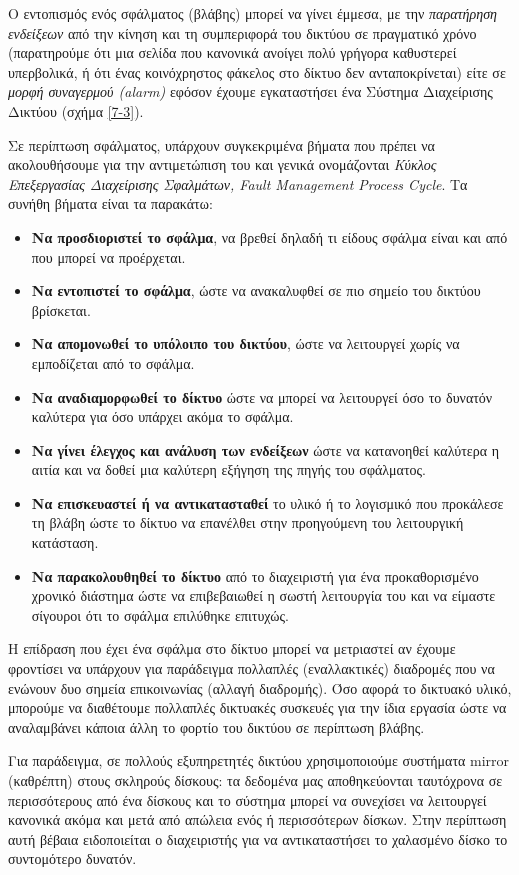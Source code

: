 Ο εντοπισμός ενός σφάλματος (βλάβης) μπορεί να γίνει έμμεσα, με την \emph{παρατήρηση ενδείξεων} από την κίνηση και τη συμπεριφορά του δικτύου σε πραγματικό χρόνο (παρατηρούμε ότι μια σελίδα που κανονικά ανοίγει πολύ γρήγορα καθυστερεί υπερβολικά, ή ότι ένας κοινόχρηστος φάκελος στο δίκτυο δεν ανταποκρίνεται) είτε σε \emph{μορφή συναγερμού (alarm)} εφόσον έχουμε εγκαταστήσει ένα Σύστημα Διαχείρισης Δικτύου (σχήμα \ref{7-3}). 

Σε περίπτωση σφάλματος, υπάρχουν συγκεκριμένα βήματα που πρέπει να ακολουθήσουμε για την αντιμετώπιση του και γενικά ονομάζονται \emph{Κύκλος Επεξεργασίας Διαχείρισης Σφαλμάτων, Fault Management Process Cycle}. Τα συνήθη βήματα είναι τα παρακάτω:

\begin{itemize}
\item \textbf{Να προσδιοριστεί το σφάλμα}, να βρεθεί δηλαδή τι είδους σφάλμα είναι και από που μπορεί να προέρχεται.
\item \textbf{Να εντοπιστεί το σφάλμα}, ώστε να ανακαλυφθεί σε πιο σημείο του δικτύου βρίσκεται.
\item \textbf{Να απομονωθεί το υπόλοιπο του δικτύου}, ώστε να λειτουργεί χωρίς να εμποδίζεται από το σφάλμα.
\item \textbf{Να αναδιαμορφωθεί το δίκτυο} ώστε να μπορεί να λειτουργεί όσο το δυνατόν καλύτερα για όσο υπάρχει ακόμα το σφάλμα.
\item \textbf{Να γίνει έλεγχος και ανάλυση των ενδείξεων} ώστε να κατανοηθεί καλύτερα η αιτία και να δοθεί μια καλύτερη εξήγηση της πηγής του σφάλματος.
\item \textbf{Να επισκευαστεί ή να αντικατασταθεί} το υλικό ή το λογισμικό που προκάλεσε τη βλάβη ώστε το δίκτυο να επανέλθει στην προηγούμενη του λειτουργική κατάσταση.
\item \textbf{Να παρακολουθηθεί το δίκτυο} από το διαχειριστή για ένα προκαθορισμένο χρονικό διάστημα ώστε να επιβεβαιωθεί η σωστή λειτουργία του και να είμαστε σίγουροι ότι το σφάλμα επιλύθηκε επιτυχώς.
\end{itemize}

Η επίδραση που έχει ένα σφάλμα στο δίκτυο μπορεί να μετριαστεί αν έχουμε φροντίσει να υπάρχουν για παράδειγμα πολλαπλές (εναλλακτικές) διαδρομές που να ενώνουν δυο σημεία επικοινωνίας (αλλαγή διαδρομής). Όσο αφορά το δικτυακό υλικό, μπορούμε να διαθέτουμε πολλαπλές δικτυακές συσκευές για την ίδια εργασία ώστε να αναλαμβάνει κάποια άλλη το φορτίο του δικτύου σε περίπτωση βλάβης. 

Για παράδειγμα, σε πολλούς εξυπηρετητές δικτύου χρησιμοποιούμε συστήματα mirror (καθρέπτη) στους σκληρούς δίσκους: τα δεδομένα μας αποθηκεύονται ταυτόχρονα σε περισσότερους από ένα δίσκους και το σύστημα μπορεί να συνεχίσει να λειτουργεί κανονικά ακόμα και μετά από απώλεια ενός ή περισσότερων δίσκων. Στην περίπτωση αυτή βέβαια ειδοποιείται ο διαχειριστής για να αντικαταστήσει το χαλασμένο δίσκο το συντομότερο δυνατόν.

